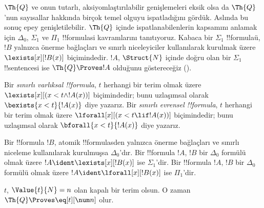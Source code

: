 \documentclass[../../../include/open-logic-section]{subfiles}
\begin{document}

$\Th{Q}$ ve onun tutarlı, aksiyomlaştırılabilir genişlemeleri eksik olsa da
$\Th{Q}$'nun sayısallar hakkında birçok temel olguyu ispatladığını gördük.
Aslında bu sonuç epey genişletilebilir. $\Th{Q}$ içinde ispatlanabilenlerin
kapsamını anlamak için $\Delta_0$, $\Sigma_1$ ve $\Pi_1$ !!{formula}s{}i
kavramlarını tanıtıyoruz. Kabaca bir $\Sigma_1$ !!{formula}{}ü, $!B$ yalnızca
önerme bağlaçları ve sınırlı niceleyiciler kullanılarak kurulmak üzere
$\lexists[x][!B(x)]$ biçimindedir. $!A$, $\Struct{N}$ içinde doğru olan bir
$\Sigma_1$ !!{sentence}{}si ise $\Th{Q} \Proves !A$ olduğunu göstereceğiz
().

\begin{defn}
Bir \emph{sınırlı varlıksal !!{formula}}, $t$ herhangi bir terim olmak üzere
$\lexists[x][(x<t\land !A(x))]$ biçimindedir; bunu uzlaşımsal olarak
$\bexists{x<t}{!A(x)}$ diye yazarız.
%
Bir \emph{sınırlı evrensel !!{formula}}, $t$ herhangi bir terim olmak üzere
$\lforall[x][(x<t\lif !A(x))]$ biçimindedir; bunu uzlaşımsal olarak
$\bforall{x<t}{!A(x)}$ diye yazarız.
\end{defn}

\begin{defn}
Bir !!{formula} $!B$, atomik !!{formula}s{}den yalnızca önerme bağlaçları ve
sınırlı niceleme kullanılarak kurulmuşsa $\Delta_0$'dır.
%
Bir !!{formula} $!A$, $!B$ bir $\Delta_0$ formülü olmak üzere
$!A\ident\lexists[x][!B(x)]$ ise $\Sigma_1$'dir.
%
Bir !!{formula} $!A$, $!B$ bir $\Delta_0$ formülü olmak üzere
$!A\ident\lforall[x][!B(x)]$ ise $\Pi_1$'dir.
\end{defn}

\begin{lem}
 $t$, $\Value{t}{N}=n$ olan kapalı bir terim
olsun. O zaman $\Th{Q} \Proves \eq[t][\num n]$ olur.
\end{lem}
\end{document}
